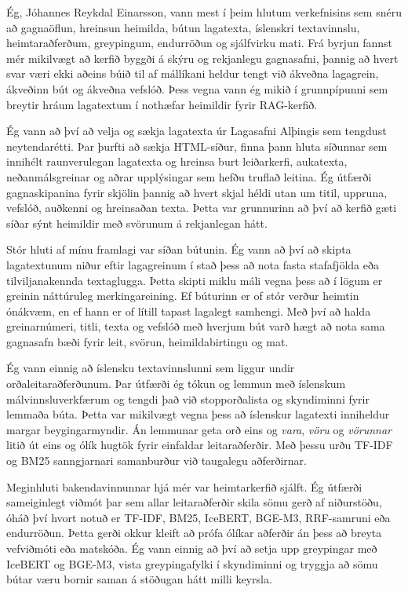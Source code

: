 \documentclass[fleqn]{report}
\begin{document}
Ég, Jóhannes Reykdal Einarsson, vann mest í þeim hlutum verkefnisins sem snéru að gagnaöflun, hreinsun heimilda, bútun lagatexta, íslenskri textavinnslu, heimtaraðferðum, greypingum, endurröðun og sjálfvirku mati. Frá byrjun fannst mér mikilvægt að kerfið byggði á skýru og rekjanlegu gagnasafni, þannig að hvert svar væri ekki aðeins búið til af mállíkani heldur tengt við ákveðna lagagrein, ákveðinn bút og ákveðna vefslóð. Þess vegna vann ég mikið í grunnpípunni sem breytir hráum lagatextum í nothæfar heimildir fyrir RAG-kerfið.

Ég vann að því að velja og sækja lagatexta úr Lagasafni Alþingis sem tengdust neytendarétti. Þar þurfti að sækja HTML-síður, finna þann hluta síðunnar sem innihélt raunverulegan lagatexta og hreinsa burt leiðarkerfi, aukatexta, neðanmálsgreinar og aðrar upplýsingar sem hefðu truflað leitina. Ég útfærði gagnaskipanina fyrir skjölin þannig að hvert skjal héldi utan um titil, uppruna, vefslóð, auðkenni og hreinsaðan texta. Þetta var grunnurinn að því að kerfið gæti síðar sýnt heimildir með svörunum á rekjanlegan hátt.

Stór hluti af mínu framlagi var síðan bútunin. Ég vann að því að skipta lagatextunum niður eftir lagagreinum í stað þess að nota fasta stafafjölda eða tilviljanakennda textaglugga. Þetta skipti miklu máli vegna þess að í lögum er greinin náttúruleg merkingareining. Ef búturinn er of stór verður heimtin ónákvæm, en ef hann er of lítill tapast lagalegt samhengi. Með því að halda greinarnúmeri, titli, texta og vefslóð með hverjum bút varð hægt að nota sama gagnasafn bæði fyrir leit, svörun, heimildabirtingu og mat.

Ég vann einnig að íslensku textavinnslunni sem liggur undir orðaleitaraðferðunum. Þar útfærði ég tókun og lemmun með íslenskum málvinnsluverkfærum og tengdi það við stopporðalista og skyndiminni fyrir lemmaða búta. Þetta var mikilvægt vegna þess að íslenskur lagatexti inniheldur margar beygingarmyndir. Án lemmunar geta orð eins og \textit{vara}, \textit{vöru} og \textit{vörunnar} litið út eins og ólík hugtök fyrir einfaldar leitaraðferðir. Með þessu urðu TF-IDF og BM25 sanngjarnari samanburður við taugalegu aðferðirnar.

Meginhluti bakendavinnunnar hjá mér var heimtarkerfið sjálft. Ég útfærði sameiginlegt viðmót þar sem allar leitaraðferðir skila sömu gerð af niðurstöðu, óháð því hvort notuð er TF-IDF, BM25, IceBERT, BGE-M3, RRF-samruni eða endurröðun. Þetta gerði okkur kleift að prófa ólíkar aðferðir án þess að breyta vefviðmóti eða matskóða. Ég vann einnig að því að setja upp greypingar með IceBERT og BGE-M3, vista greypingafylki í skyndiminni og tryggja að sömu bútar væru bornir saman á stöðugan hátt milli keyrsla.
\end{document}
